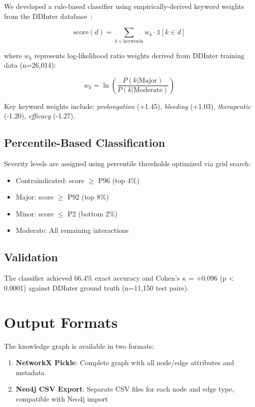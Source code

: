 \documentclass[11pt]{article}
\begin{document}
We developed a rule-based classifier using empirically-derived keyword weights from the DDInter database~\cite{xiong2022ddinter}:

\begin{equation}
\text{score}(d) = \sum_{k \in \text{keywords}} w_k \cdot \mathbb{1}[k \in d]
\end{equation}

where $w_k$ represents log-likelihood ratio weights derived from DDInter training data (n=26,014):

\begin{equation}
w_k = \ln\left(\frac{P(k|\text{Major})}{P(k|\text{Moderate})}\right)
\end{equation}

Key keyword weights include: \textit{prolongation} (+1.45), \textit{bleeding} (+1.03), \textit{therapeutic} (-1.20), \textit{efficacy} (-1.27).

\subsection{Percentile-Based Classification}

Severity levels are assigned using percentile thresholds optimized via grid search:
\begin{itemize}
    \item Contraindicated: score $\geq$ P96 (top 4\%)
    \item Major: score $\geq$ P92 (top 8\%)
    \item Minor: score $\leq$ P2 (bottom 2\%)
    \item Moderate: All remaining interactions
\end{itemize}

\subsection{Validation}

The classifier achieved 66.4\% exact accuracy and Cohen's $\kappa$ = +0.096 (p < 0.0001) against DDInter ground truth (n=11,150 test pairs).

\section{Output Formats}

The knowledge graph is available in two formats:
\begin{enumerate}
    \item \textbf{NetworkX Pickle}: Complete graph with all node/edge attributes and metadata
    \item \textbf{Neo4j CSV Export}: Separate CSV files for each node and edge type, compatible with Neo4j import
\end{enumerate}
\end{document}

